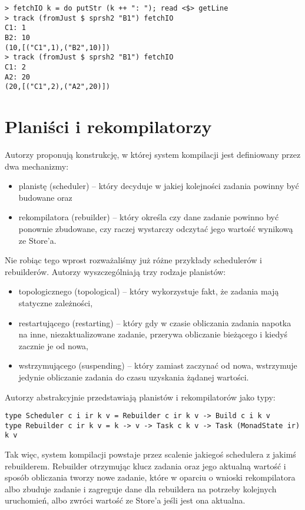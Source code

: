 \begin{lstlisting}
> fetchIO k = do putStr (k ++ ": "); read <$> getLine
> track (fromJust $ sprsh2 "B1") fetchIO
C1: 1
B2: 10
(10,[("C1",1),("B2",10)])
> track (fromJust $ sprsh2 "B1") fetchIO
C1: 2
A2: 20
(20,[("C1",2),("A2",20)])

\end{lstlisting}

\section{Planiści i rekompilatorzy}

Autorzy proponują konstrukcję, w której system kompilacji jest definiowany przez dwa mechanizmy:
\begin{itemize}
\item planistę (scheduler) -- który decyduje w jakiej kolejności zadania powinny być budowane oraz
\item rekompilatora (rebuilder) -- który określa czy dane zadanie powinno być ponownie zbudowane, czy raczej wystarczy odczytać jego wartość wynikową ze Store'a.
\end{itemize}

Nie robiąc tego wprost rozważaliśmy już różne przykłady schedulerów i rebuilderów. Autorzy wyszczególniają trzy rodzaje planistów:

\begin{itemize}
\item topologicznego (topological) -- który wykorzystuje fakt, że zadania mają statyczne zależności,
\item restartującego (restarting) -- który gdy w czasie obliczania zadania napotka na inne, niezaktualizowane zadanie, przerywa obliczanie bieżącego i kiedyś zacznie je od nowa,
\item wstrzymującego (suspending) -- który zamiast zaczynać od nowa, wstrzymuje jedynie obliczanie zadania do czasu uzyskania żądanej wartości.
\end{itemize}

Autorzy abstrakcyjnie przedstawiają planistów i rekompilatorów jako typy:

\begin{lstlisting}
type Scheduler c i ir k v = Rebuilder c ir k v -> Build c i k v
type Rebuilder c ir k v = k -> v -> Task c k v -> Task (MonadState ir) k v
\end{lstlisting}

Tak więc, system kompilacji powstaje przez scalenie jakiegoś schedulera z jakimś rebuilderem. Rebuilder otrzymując klucz zadania oraz jego aktualną wartość i sposób obliczania tworzy nowe zadanie, które w oparciu o wnioski rekompilatora albo zbuduje zadanie i zagreguje dane dla rebuildera na potrzeby kolejnych uruchomień, albo zwróci wartość ze Store'a jeśli jest ona aktualna.

